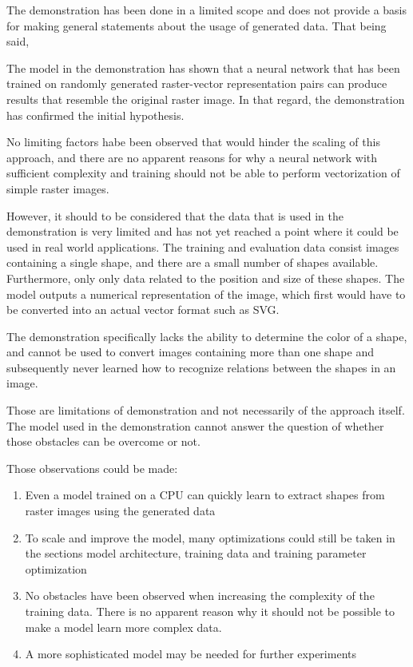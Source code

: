 \documentclass[12pt, a4paper, titlepage]{report}
\begin{document}
The demonstration has been done in a limited scope and does not provide a basis for making general statements about the usage of generated data. That being said, 

The model in the demonstration has shown that a neural network that has been trained on randomly generated raster-vector representation pairs can produce results that resemble the original raster image. In that regard, the demonstration has confirmed the initial hypothesis.

No limiting factors habe been observed that would hinder the scaling of this approach, and there are no apparent reasons for why a neural network with sufficient complexity and training should not be able to perform vectorization of simple raster images.


However, it should to be considered that the data that is used in the demonstration is very limited and has not yet reached a point where it could be used in real world applications. The training and evaluation data consist images containing a single shape, and there are a small number of shapes available. Furthermore, only only data related to the position and size of these shapes. The model outputs a numerical representation of the image, which first would have to be converted into an actual vector format such as SVG.

The demonstration specifically lacks the ability to determine the color of a shape, and cannot be used to convert images containing more than one shape and subsequently never learned how to recognize relations between the shapes in an image.

\vspace{0.5cm}
Those are limitations of demonstration and not necessarily of the approach itself. The model used in the demonstration cannot answer the question of whether those obstacles can be overcome or not.

Those observations could be made:

\begin{enumerate}[label=\Roman*.]
   \item Even a model trained on a CPU can quickly learn to extract shapes from raster images using the generated data
   \item To scale and improve the model, many optimizations could still be taken in the sections model architecture, training data and training parameter optimization
   \item No obstacles have been observed when increasing the complexity of the training data. There is no apparent reason why it should not be possible to make a model learn more complex data.
   \item A more sophisticated model may be needed for further experiments
\end{enumerate}
\end{document}
